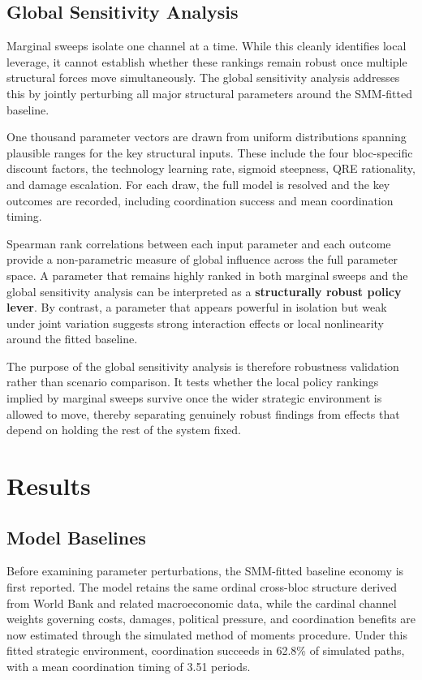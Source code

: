 \documentclass[12pt,a4paper]{article}
\begin{document}
\subsection{Global Sensitivity Analysis}

Marginal sweeps isolate one channel at a time. While this cleanly identifies local leverage, it cannot establish whether these rankings remain robust once multiple structural forces move simultaneously. The global sensitivity analysis addresses this by jointly perturbing all major structural parameters around the SMM-fitted baseline.

One thousand parameter vectors are drawn from uniform distributions spanning plausible ranges for the key structural inputs. These include the four bloc-specific discount factors, the technology learning rate, sigmoid steepness, QRE rationality, and damage escalation. For each draw, the full model is resolved and the key outcomes are recorded, including coordination success and mean coordination timing.

Spearman rank correlations between each input parameter and each outcome provide a non-parametric measure of global influence across the full parameter space. A parameter that remains highly ranked in both marginal sweeps and the global sensitivity analysis can be interpreted as a \textbf{structurally robust policy lever}. By contrast, a parameter that appears powerful in isolation but weak under joint variation suggests strong interaction effects or local nonlinearity around the fitted baseline.

The purpose of the global sensitivity analysis is therefore robustness validation rather than scenario comparison. It tests whether the local policy rankings implied by marginal sweeps survive once the wider strategic environment is allowed to move, thereby separating genuinely robust findings from effects that depend on holding the rest of the system fixed.

\section{Results}

\subsection{Model Baselines}

Before examining parameter perturbations, the SMM-fitted baseline economy is first reported. The model retains the same ordinal cross-bloc structure derived from World Bank and related macroeconomic data, while the cardinal channel weights governing costs, damages, political pressure, and coordination benefits are now estimated through the simulated method of moments procedure. Under this fitted strategic environment, coordination succeeds in 62.8\% of simulated paths, with a mean coordination timing of 3.51 periods.
\end{document}
